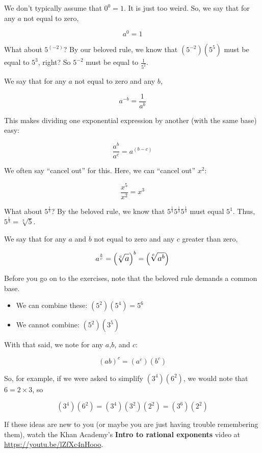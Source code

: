 We don't typically assume that $0^0 = 1$. It is just too
weird. So, we say that for any $a$ not equal to zero,

$$a^0 = 1$$

What about $5^{(-2)}$?  By our beloved rule, we know that
$\left(5^{-2}\right)\left(5^5\right)$ must be equal to $5^3$, right?
So $5^{-2}$ must be equal to $\frac{1}{5^2}$.

We say that for any $a$ not equal to zero and any $b$,

$$a^{-b} = \frac{1}{a^{b}}$$

This makes dividing one exponential expression by another (with the same base) easy:

$$\frac{a^b}{a^c} = a^{(b-c)}$$

We often say ``cancel out'' for this. Here, we can ``cancel out'' $x^2$:

$$\frac{x^5}{x^2} = x^3$$

What about $5^{\frac{1}{3}}$? By the beloved rule, we know that $5^{\frac{1}{3}}5^{\frac{1}{3}}5^{\frac{1}{3}}$ must equal $5^1$. Thus, $5^{\frac{1}{3}} = \sqrt[3]{5}$.

We say that for any $a$ and $b$ not equal to zero and any $c$ greater than zero,

\[
\large {a^{\frac{b}{c}}} = \left(\sqrt[c]{a}\right)^{b}=\left(\sqrt[c]{a^b}\right)
\]

Before you go on to the exercises, note that the beloved rule demands a common base.
\begin{itemize}
\item We can combine these: $\left(5^2\right)\left(5^4\right) = 5^6$
\item We cannot combine: $\left(5^2\right)\left(3^5\right)$
\end{itemize}

With that said, we note for any $a$,$b$, and $c$:

$$\left(ab\right)^c = \left(a^c\right) \left(b^c\right)$$

So, for example, if we were asked to simplify
$\left(3^4\right)\left(6^2\right)$, we would note that $6 = 2 \times
3$, so

$$\left(3^4\right)\left(6^2\right) = \left(3^4\right)\left(3^2\right)\left(2^2\right)  = \left(3^6\right)\left(2^2\right)$$


If these ideas are new to you (or maybe you are just having trouble remembering them),
watch the Khan Academy's \textbf{Intro to rational exponents} video at
\url{https://youtu.be/lZfXc4nHooo}.


